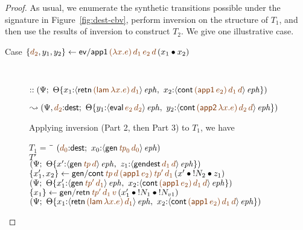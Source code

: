 \begin{proof} As usual, we enumerate the synthetic transitions possible under
the signature in Figure~\ref{fig:dest-cbv}, perform inversion 
on the structure of $T_1$, and then use the results of inversion to
construct $T_2$. We give one illustrative case. 

\begin{description}

\item
  [Case $\trstep{\lf{d_2}, y_1, y_2}
    {{\sf ev/app1}\,\lf{(\lambda x. e)}\,\lf{d_1}\,\lf{e_2}\,\lf{d}\,
      (\tfuser{x_1}{x_2})}$]~

\qquad 
  $:: \left(\Psi; ~
   \tackon{\Theta}
    {x_1{:}\iseph{\susp{{\sf retn}\,
       \lf{({\sf lam}\, \lambda x.e)}\,\lf{d_1}}}, ~
     x_2{:}\iseph{\susp{{\sf cont}\,\lf{({\sf app1}\,e_2)}\,\lf{d_1}\,\lf{d}}}
    }\right)$

\qquad\qquad
  $\leadsto \left(\Psi, \lf{d_2}{:}{\sf dest}; ~
   \tackon{\Theta}
    {y_1{:}\iseph{\susp{{\sf eval}\,\lf{e_2}\,\lf{d_2}}}, ~
     y_2{:}\iseph{\susp{{\sf cont}\,
       \lf{({\sf app2}\,\lambda x.e)}\,\lf{d_2}\,\lf{d}}}
    }\right)$

\medskip
Applying inversion (Part 2, then Part 3) to $T_1$, we have

\begin{tabbing}
$T_1 = ~$ \= \qquad \= $(\lf{d_0}{:}{\sf dest}; ~ x_0{:}\iseph{\susp{{\sf gen}\,\lf{{\it tp}_0}\,\lf{d_0}}})$
\\
\> $T'$
\\
\>\> $\left(\Psi; ~
   \tackon{\Theta}
    {x'{:}\iseph{\susp{{\sf gen}\,\lf{{\it tp}}\,\lf{d}}}, ~
     z_1{:}\iseph{\susp{{\sf gendest}\,\lf{d_1}\,\lf{d}}}
    }\right)$
\\
\> $\trstep{x_1', x_2}{{\sf gen/cont}\,
       \lf{{\it tp}}\,\lf{d}\,\lf{({\sf app1}\,e_2)}\,
       \lf{{\it tp}'}\,\lf{d_1}\,
       (\tfuser{x'}{\tfuser{\tbangr{N_2}}{z_1}})}$
\\
\>\> $\left(\Psi; ~
   \tackon{\Theta}
    {x_1'{:}\iseph{\susp{{\sf gen}\,\lf{{\it tp}'}\,\lf{d_1}}}, ~
     x_2{:}\iseph{\susp{{\sf cont}\,\lf{({\sf app1}\,e_2)}\,\lf{d_1}\,\lf{d}}}
    }\right)$
\\
\> $\trstep{x_1}{{\sf gen/retn}\,
       \lf{{\it tp}'}\,\lf{d_1}\,\lf{v}\,
       (\tfuser{x_1'}{\tfuser{\tbangr{N_1}}{\tbangr{N_{v1}}}})}$
\\
\>\> $\left(\Psi; ~
   \tackon{\Theta}
    {x_1{:}\iseph{\susp{{\sf retn}\,\lf{({\sf lam}\,\lambda x.e)}\,\lf{d_1}}}, ~
     x_2{:}\iseph{\susp{{\sf cont}\,\lf{({\sf app1}\,e_2)}\,\lf{d_1}\,\lf{d}}}
    }\right)$
\end{tabbing}


\end{description}
\end{proof}
